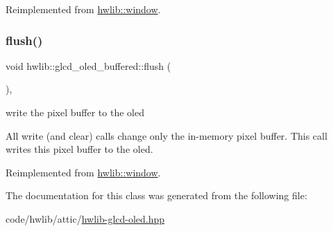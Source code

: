 Reimplemented from \hyperlink{classhwlib_1_1window_a5e781163353ce26cb4dc5b2cbe40ad05}{hwlib\+::window}.

\mbox{\label{classhwlib_1_1glcd__oled__buffered_a68ed87e12c7f7ed0abe621b14af9d604}} 
\subsubsection{\texorpdfstring{flush()}{flush()}}
{\footnotesize\ttfamily void hwlib\+::glcd\+\_\+oled\+\_\+buffered\+::flush (\begin{DoxyParamCaption}{ }\end{DoxyParamCaption})\hspace{0.3cm}{\ttfamily [inline]}, {\ttfamily [virtual]}}



write the pixel buffer to the oled 

All write (and clear) calls change only the in-\/memory pixel buffer. This call writes this pixel buffer to the oled. 

Reimplemented from \hyperlink{classhwlib_1_1window_a2b654a98872d174173e1df24a444c949}{hwlib\+::window}.



The documentation for this class was generated from the following file\+:\begin{DoxyCompactItemize}
\item 
code/hwlib/attic/\hyperlink{attic_2hwlib-glcd-oled_8hpp}{hwlib-\/glcd-\/oled.\+hpp}\end{DoxyCompactItemize}
